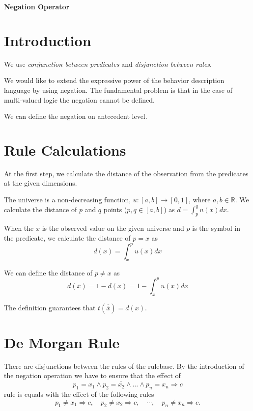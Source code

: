 \documentclass[a4paper,12pt]{article}
\begin{document}
\begin{center}
    \Large \textbf{Negation Operator}
\end{center}

\section{Introduction}

We use \textit{conjunction between predicates} and \textit{disjunction between rules}.

We would like to extend the expressive power of the behavior description language by using negation. The fundamental problem is that in the case of multi-valued logic the negation cannot be defined.

We can define the negation on antecedent level. 

\section{Rule Calculations}

At the first step, we calculate the distance of the observation from the predicates at the given dimensions.

The universe is a non-decreasing function, $u: [a, b] \rightarrow [0, 1]$, where $a, b \in \mathbb{R}$. We calculate the distance of $p$ and $q$ points ($p, q \in [a, b]$) as $d = \int_{p}^{q} u(x) dx$.

When the $x$ is the observed value on the given universe and $p$ is the symbol in the predicate, we calculate the distance of $p = x$ as
$$
d(x) = \int_{x}^{p} u(x) dx
$$

We can define the distance of $p \neq x$ as
$$
d(\overline{x}) = 1 - d(x) = 1 - \int_{x}^{p} u(x) dx
$$

The definition guarantees that $t(\overline{\overline{x}}) = d(x)$.

\section{De Morgan Rule}

There are disjunctions between the rules of the rulebase. By the introduction of the negation operation we have to ensure that the effect of
\begin{equation}
\overline{p_1 = x_1 \wedge p_2 = x_2 \wedge \ldots \wedge p_n = x_n} \Rightarrow c
\label{eq:first}
\end{equation}
rule is equals with the effect of the following rules
\begin{equation}
p_1 \neq x_1 \Rightarrow c, \quad p_2 \neq x_2 \Rightarrow c, \quad \cdots, \quad p_n \neq x_n \Rightarrow c.
\label{eq:second}
\end{equation}
\end{document}
